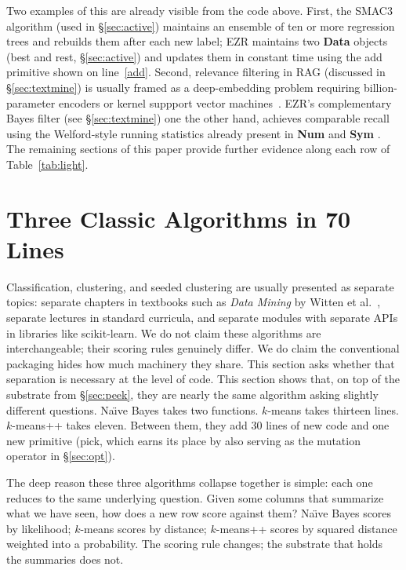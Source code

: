 \documentclass[AMA,STIX2COL]{WileyNJDv5}
\newcommand{\IT}{{\sffamily EZR}}
\newcommand{\cls}[1]{%
  \setlength{\fboxsep}{1.5pt}%
  \colorbox{clsbg}{\sffamily\bfseries{#1}}%
}
\begin{document}
Two examples of this are already visible from the code above. First,
the SMAC3~\cite{hutter2011sequential} algorithm (used in \S\ref{sec:active})
maintains an ensemble of ten
or more regression trees and rebuilds them after each new label;
\IT{} maintains two \cls{Data} objects (\textsf{best} and
\textsf{rest}, \S\ref{sec:active}) and updates them in constant
time using the \textsf{add} primitive shown on
line~\ref{add}. Second, relevance filtering in RAG (discussed in \S\ref{sec:textmine}) is usually
framed as a deep-embedding problem requiring billion-parameter
encoders or kernel suppport vector machines~\cite{Yu2018}. 
\IT{}'s complementary Bayes filter
(see \S\ref{sec:textmine}) one the other hand, achieves comparable recall using the
Welford-style running statistics already present in \cls{Num} and
\cls{Sym}. The remaining sections of this paper provide further
evidence along each row of Table~\ref{tab:light}.

\section{Three Classic Algorithms in 70 Lines}\label{sec:famous}

Classification, clustering, and seeded clustering are usually
presented as separate topics: separate chapters in textbooks such as
{\em Data Mining} by Witten et al.~\cite{Witten:2005}, separate
lectures in standard curricula, and separate modules with separate
APIs in libraries like scikit-learn. We do not claim these
algorithms are interchangeable; their scoring rules genuinely
differ. We do claim the conventional packaging hides how much
machinery they share. This section asks whether that separation
is necessary at the level of code.
 This section shows that, on top of the
substrate from \S\ref{sec:peek}, they are nearly the same
algorithm asking slightly different questions. Na\"{\i}ve Bayes takes two
functions. $k$-means takes thirteen lines. $k$-means++ takes
eleven. Between them, they add 30 lines of new code and one new
primitive (\textsf{pick}, which earns its place by also serving
as the mutation operator in \S\ref{sec:opt}).

The deep reason these three algorithms collapse together is
simple: each one reduces to the same underlying question. Given
some columns that summarize what we have seen, how does a new
row score against them? Na\"{\i}ve Bayes scores by likelihood;
$k$-means scores by distance; $k$-means++ scores by squared
distance weighted into a probability. The scoring rule changes;
the substrate that holds the summaries does not.
\end{document}

